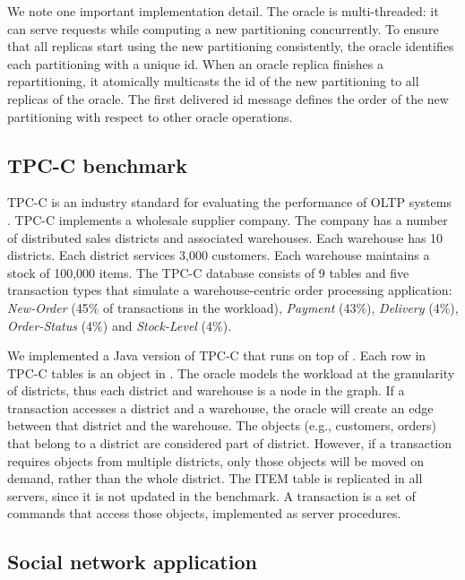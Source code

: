 We note one important implementation detail.  The oracle is multi-threaded: it
can serve requests while computing a new partitioning concurrently. To ensure
that all replicas start using the new partitioning consistently, the oracle
identifies each partitioning with a unique id.  When an oracle replica finishes
a repartitioning, it atomically multicasts the id of the new partitioning to
all replicas of the oracle.  The first delivered id message defines the order
of the new partitioning with respect to other oracle operations.


\subsection{TPC-C benchmark}
\label{sec:imp:tpcc}


TPC-C is an industry standard for evaluating the performance of OLTP systems
\cite{tpcc}. TPC-C implements a wholesale supplier company. The company has a
number of distributed sales districts and associated warehouses. Each warehouse
has 10 districts. Each district services 3,000 customers. Each warehouse
maintains a stock of 100,000 items. The TPC-C database consists of 9 tables and
five transaction types that simulate a warehouse-centric order processing
application: \emph{New-Order} (45\% of transactions in the workload),
\emph{Payment} (43\%), \emph{Delivery} (4\%), \emph{Order-Status} (4\%) and
\emph{Stock-Level} (4\%).

We implemented a Java version of TPC-C that runs on top of \dynastar. Each row
in TPC-C tables is an object in \dynastar. The oracle models the workload at the
granularity of districts, thus each district and warehouse is a node in the
graph. If a transaction accesses a district and a warehouse, the oracle will
create an edge between that district and the warehouse. The objects (e.g.,
customers, orders) that belong to a district are considered part of district.
However, if a transaction requires objects from multiple districts, only those
objects will be moved on demand, rather than the whole district. The ITEM table
is replicated in all servers, since it is not updated in the benchmark. A
transaction is a set of commands that access those objects, implemented as
server procedures.

\subsection{Social network application}
\label{sec:imp:\dynastarappname}

